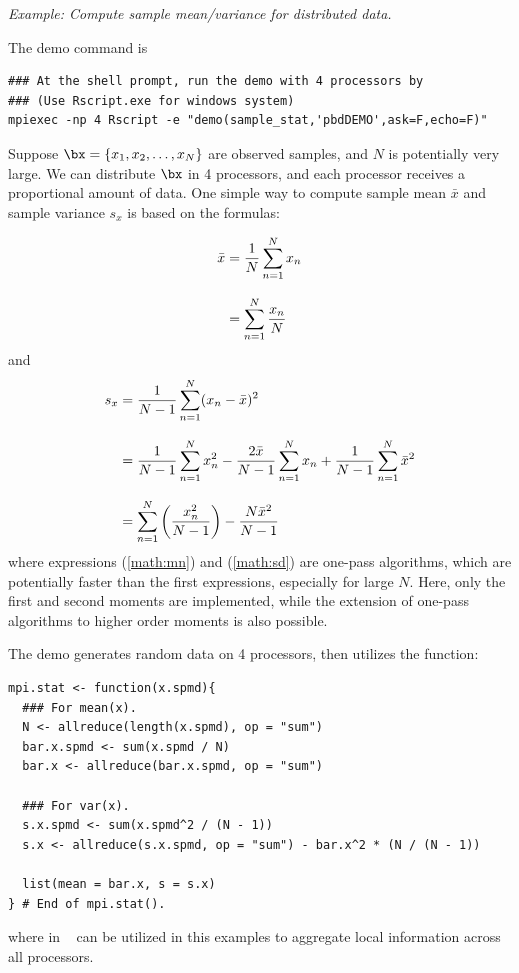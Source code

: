 \emph{Example:  Compute sample mean/variance for distributed data.}

The demo command is
\begin{lstlisting}
### At the shell prompt, run the demo with 4 processors by
### (Use Rscript.exe for windows system)
mpiexec -np 4 Rscript -e "demo(sample_stat,'pbdDEMO',ask=F,echo=F)"
\end{lstlisting}

Suppose $\bx = \{x_1, x_2, \ldots, x_N\}$
are observed samples, and $N$ is potentially very large.
We can distribute $\bx$ in 4 processors, and each processor receives a proportional amount of data. One simple way to compute sample mean $\bar{x}$ and
sample variance $s_x$ is based on the formulas:

\begin{align}
\bar{x} &= \frac{1}{N} \sum_{n = 1}^N x_n \notag \\[.3cm]
        &= \sum_{n = 1}^N \frac{x_n}{N} \label{math:mn}
\end{align}
and
\begin{align}
s_x     &= \frac{1}{N - 1} \sum_{n = 1}^N (x_n - \bar{x})^2 \notag \\[.3cm]
        &= \frac{1}{N - 1} \sum_{n = 1}^N x_n^2 - \frac{2\bar{x}}{N - 1}\sum_{n = 1}^N x_n +  \frac{1}{N - 1}\sum_{n = 1}^N\bar{x}^2 \notag \\[.3cm]
        &= \sum_{n = 1}^N \left(\frac{x^2_n}{N-1}\right) - \frac{N \bar{x}^2}{N-1} \label{math:sd}
\end{align}
where expressions (\ref{math:mn}) and (\ref{math:sd}) are one-pass algorithms,
which are potentially faster than the first expressions,
especially for large $N$. Here, only the first and second moments are implemented, while
the extension of one-pass algorithms to higher order moments is also
possible.

The demo generates random data on 4 processors, then
utilizes the  function:
\begin{lstlisting}[language=rr,title=R Code]
mpi.stat <- function(x.spmd){
  ### For mean(x).
  N <- allreduce(length(x.spmd), op = "sum")
  bar.x.spmd <- sum(x.spmd / N)
  bar.x <- allreduce(bar.x.spmd, op = "sum")

  ### For var(x).
  s.x.spmd <- sum(x.spmd^2 / (N - 1))
  s.x <- allreduce(s.x.spmd, op = "sum") - bar.x^2 * (N / (N - 1))

  list(mean = bar.x, s = s.x)
} # End of mpi.stat().
\end{lstlisting}
where  in ~\citep{Chen2012pbdMPIpackage} can
be utilized in this examples to aggregate local information across
all processors.


